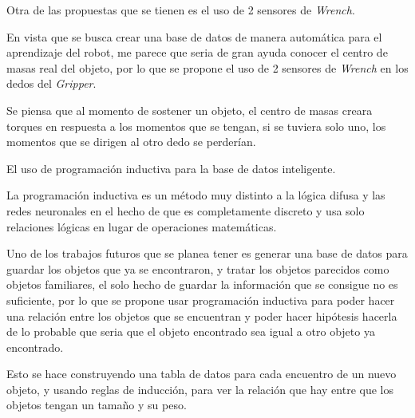 Otra de las propuestas que se tienen es el uso de 2 sensores de \textit{Wrench}.

En vista que se busca crear una base de datos de manera automática para el aprendizaje del robot, me parece que seria de gran ayuda conocer el centro de masas real del objeto, por lo que se propone el uso de 2 sensores de \textit{Wrench} en los dedos del \textit{Gripper}.

Se piensa que al momento de sostener un objeto, el centro de masas creara torques en respuesta a los momentos que se tengan, si se tuviera solo uno, los momentos que se dirigen al otro dedo se perderían.



El uso de programación inductiva para la base de datos inteligente.

La programación inductiva es un método muy distinto a la lógica difusa y las redes neuronales en el hecho de que es completamente discreto y usa solo relaciones lógicas en lugar de operaciones matemáticas.

Uno de los trabajos futuros que se planea tener es generar una base de datos para guardar los objetos que ya se encontraron, y tratar los objetos parecidos como objetos familiares, el solo hecho de guardar la información que se consigue no es suficiente, por lo que se propone usar programación inductiva para poder hacer una relación entre los objetos que se encuentran y poder hacer hipótesis hacerla de lo probable que seria que el objeto encontrado sea igual a otro objeto ya encontrado.

Esto se hace construyendo una tabla de datos para cada encuentro de un nuevo objeto, y usando reglas de inducción, para ver la relación que hay entre que los objetos tengan un tamaño y su peso.



